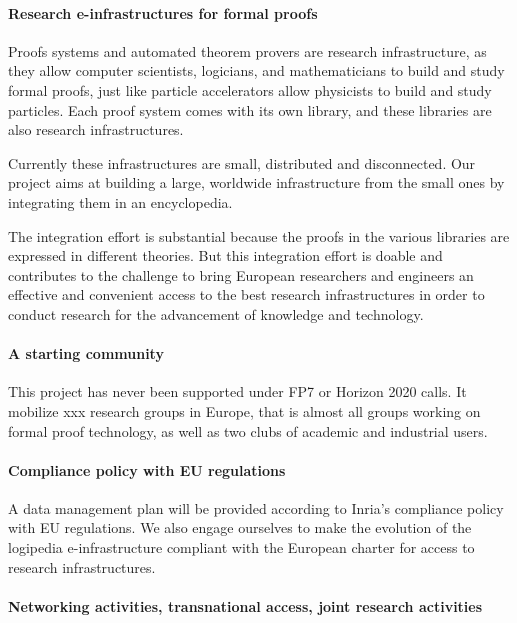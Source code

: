 \paragraph{Research e-infrastructures for formal proofs}

Proofs systems and automated theorem provers are research
infrastructure, as they allow computer scientists, logicians, and
mathematicians to build and study formal proofs, just like particle
accelerators allow physicists to build and study particles. Each proof
system comes with its own library, and these libraries are also
research infrastructures.

Currently these infrastructures are small, distributed and
disconnected.  Our project aims at building a large, worldwide
infrastructure from the small ones by integrating them in an
encyclopedia.

The integration effort is substantial because the proofs in the
various libraries are expressed in different theories. But this
integration effort is doable and contributes to the challenge to bring
European researchers and engineers an effective and convenient access
to the best research infrastructures in order to conduct research for
the advancement of knowledge and technology.

\paragraph{A starting community}

This project has never been supported under FP7 or Horizon 2020 calls.
It mobilize xxx research groups in Europe, that is almost all groups
working on formal proof technology, as well as two clubs of academic
and industrial users.

\paragraph{Compliance policy with EU regulations}

A data management plan will be provided according to Inria’s
compliance policy with EU regulations. We also engage ourselves to
make the evolution of the logipedia e-infrastructure compliant with
the European charter for access to research infrastructures.

\paragraph{Networking activities, transnational access, joint research activities}

